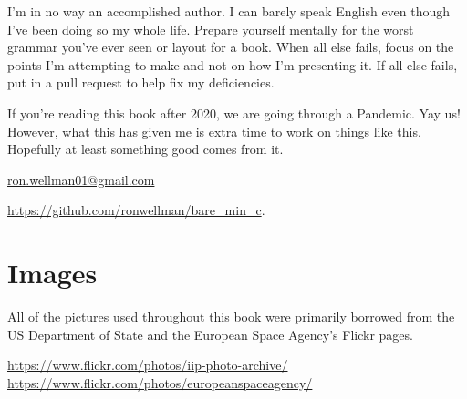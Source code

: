 \documentclass[../main.tex]{subfiles}
\begin{document}
I'm in no way an accomplished author.  I can barely speak English even though I've been doing so my whole life.  Prepare yourself mentally for the worst grammar you've ever seen or layout for a book.  When all else fails, focus on the points I'm attempting to make and not on how I'm presenting it.  If all else fails, put in a pull request to help fix my deficiencies.

If you're reading this book after 2020, we are going through a Pandemic.  Yay us!  However, what this has given me is extra time to work on things like this.  Hopefully at least something good comes from it.

\href{mailto:ron.wellman01@gmail.com}{ron.wellman01@gmail.com}

\href{https://github.com/ronwellman/bare_min_c}{https://github.com/ronwellman/bare\_min\_c}.

\section{Images}
All of the pictures used throughout this book were primarily borrowed from the US Department of State and the European Space Agency's Flickr pages.

\url{https://www.flickr.com/photos/iip-photo-archive/}\\
\url{https://www.flickr.com/photos/europeanspaceagency/}

\mainmatter
\end{document}
